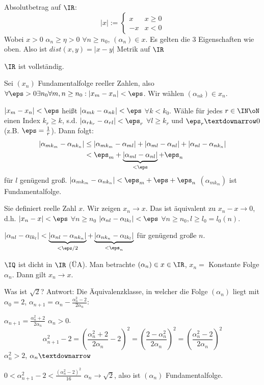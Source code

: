 \begin{enumerate}
    Absolutbetrag auf $\IR$: \[|x|:=\begin{cases}
                                     x & x\geq 0\\
                                     -x & x<0
                                    \end{cases}
 \]
 Wobei $x>0$ \gdw $\alpha_n\geq\eta>0$ $\forall n\geq n_0$, $(\alpha_n)\in x$. Es gelten die 3 Eigenschaften wie oben. Also ist $dist(x,y)=|x-y|$ Metrik auf $\IR$
 
 \begin{Fakt}
  $\IR$ ist vollständig.
 \end{Fakt}

 \begin{Beweis}
  Sei $(x_n)$ Fundamentalfolge reeller Zahlen, also $\forall \eps>0 \exists n_0 \forall m,n\geq n_0: |x_m-x_n|<\eps$. Wir wählen $(\alpha_{nk})\in x_n$.
  
  $|x_m-x_n|<\eps$ heißt $|\alpha_{mk}-\alpha_{nk}|<\eps$ $\forall k<k_0$. Wähle für jedes $r\in\IN\oN$ einen Index $k_r\geq k$, s.d. $|\alpha_{rk_r}-\alpha_{rl}|<\eps_r$ $\forall l\geq k_r$ und $\eps_r\textdownarrow 0$ (z.B. $\eps=\frac{1}{r}$). Dann folgt:
  \begin{align*}
   |\alpha_{mk_m}-\alpha_{nk_n}|&\leq |\alpha_{mk_m}-\alpha_{ml}|+|\alpha_{ml}-\alpha_{nl}|+|\alpha_{nl}-\alpha_{nk_n}|\\
   &< \eps_m +\underbrace{|\alpha_{ml}-\alpha_{nl}|}_{<\eps}+\eps_n 
  \end{align*}
  für $l$ genügend groß. \folge $|\alpha_{mk_m}-\alpha_{nk_n}|<\eps_m+\eps+\eps_n$ \folge $(\alpha_{mk_m})$ ist Fundamentalfolge.

  Sie definiert reelle Zahl $x$. Wir zeigen $x_n\rightarrow x$. Das ist äquivalent zu $x_n-x\rightarrow 0$, d.h. $|x_n-x|<\eps$ $\forall n\geq n_0$ \gdw $|\alpha_{nl}-\alpha_{lk_l}|<\eps$ $\forall n\geq n_0, l\geq l_0=l_0(n)$.
  
  $|\alpha_{nl}-\alpha_{lk_l}|<\underbrace{|\alpha_{nl}-\alpha_{nk_n}|}_{<\eps/2}+\underbrace{|\alpha_{nk_n}-\alpha_{lk_l}|}_{<\eps_n}$
  für genügend große $n$.
 \end{Beweis}

 \begin{Bemerkung}
  $\IQ$ ist dicht in $\IR$ (ÜA). Man betrachte $(\alpha_n)\in x\in\IR$, $x_n=$ Konstante Folge $\alpha_n$. Dann gilt $x_n\rightarrow x$. 
 \end{Bemerkung}

 Was ist $\sqrt 2$? Antwort: Die Äquivalenzklasse, in welcher die Folge $(\alpha_n)$ liegt mit $\alpha_0=2$, $\alpha_{n+1}=\alpha_n-\frac{\alpha_n^2-2}{2\alpha_n}$:
 
 $\alpha_{n+1}=\frac{\alpha_n^2+2}{2\alpha_n}$ \folge $\alpha_n>0$.
 \[ \alpha_{n+1}^2-2=\left(\frac{\alpha_n^2+2}{2\alpha_n}-2\right)^2=\left( \frac{2-\alpha_n^2}{2\alpha_n}\right)^2=\left( \frac{\alpha_n^2-2}{2\alpha_n}\right)^2\]
 \folge $\alpha_n^2>2$, $\alpha_n\textdownarrow$
 
 $0<\alpha_{n+1}^2-2<\frac{(\alpha_n^2-2)^2}{16}$ \folge $\alpha_n\rightarrow \sqrt{2}$, also ist $(\alpha_n)$ Fundamentalfolge.
\end{enumerate}

